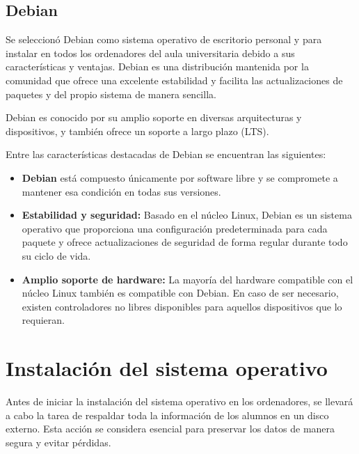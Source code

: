 			
			
		\subsection{Debian}\label{sub:debian}
			


Se seleccionó Debian como sistema operativo de escritorio personal y para instalar en todos los ordenadores del aula universitaria debido a sus características y ventajas. Debian es una distribución mantenida por la comunidad que ofrece una excelente estabilidad y facilita las actualizaciones de paquetes y del propio sistema de manera sencilla.\par

Debian es conocido por su amplio soporte en diversas arquitecturas y dispositivos, y también ofrece un soporte a largo plazo (LTS).\par 

Entre las características destacadas de Debian se encuentran las siguientes:

    		\begin{itemize}
				
				\item \textbf{ Debian} está compuesto únicamente por software libre y se compromete a mantener esa condición en todas sus versiones.

    			\item \textbf{ Estabilidad y seguridad:} Basado en el núcleo Linux, Debian es un sistema operativo que proporciona una configuración predeterminada para cada paquete y ofrece actualizaciones de seguridad de forma regular durante todo su ciclo de vida.

   				 \item \textbf{ Amplio soporte de hardware:} La mayoría del hardware compatible con el núcleo Linux también es compatible con Debian. En caso de ser necesario, existen controladores no libres disponibles para aquellos dispositivos que lo requieran.			
			
			
			\end{itemize}	
			
	\section{Instalación del sistema operativo}
			
	 		Antes de iniciar la instalación del sistema operativo en los ordenadores, se llevará a cabo la tarea de respaldar toda la información de los alumnos en un disco externo. Esta acción se considera esencial para preservar los datos de manera segura y evitar pérdidas.\par 

